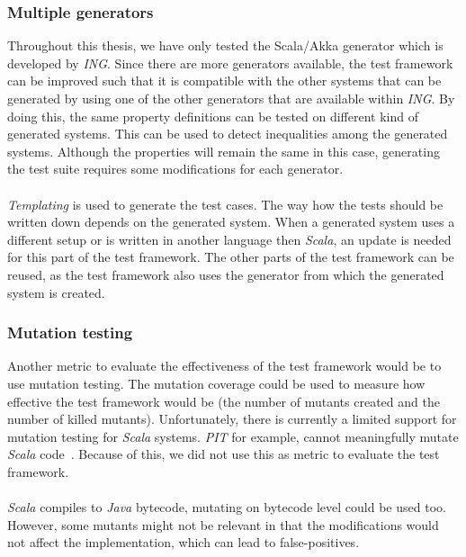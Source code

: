 \subsubsection{Multiple generators}
Throughout this thesis, we have only tested the Scala/Akka generator which is
developed by \textit{ING}. Since there are more generators available, the test
framework can be improved such that it is
compatible with the other systems that can be generated by using one of the
other generators that are available within \textit{ING}. By doing this, the same
property definitions can be tested on different kind of generated systems. This
can be used to detect inequalities among the generated systems. Although the properties will remain the same in this case, generating the test suite requires some modifications for each generator.\\
\\
\textit{Templating} is used to generate the test cases. The way how the tests should be written down depends on the generated system. When a generated system uses a different setup or is written in another language then \textit{Scala}, an update is needed for this part of the test framework. The other parts of the test framework can be reused, as the test framework also uses the generator from which the generated system is created.

\subsubsection{Mutation testing}
Another metric to evaluate the effectiveness of the test framework would be to use
mutation testing. The mutation coverage could be used to measure how
effective the test framework would be (the number of mutants created and the
number of killed mutants). Unfortunately, there is currently a limited support
for mutation testing for \textit{Scala} systems. \textit{PIT} for example, cannot meaningfully
mutate \textit{Scala} code~\cite{siteSbtPit2017}. Because of this, we did not
use this as metric to evaluate the test framework.\\
\\
\textit{Scala} compiles to \textit{Java} bytecode, mutating on bytecode level
could be used too. However, some mutants might not be relevant in that the
modifications would not affect the implementation, which can lead to
false-positives.

